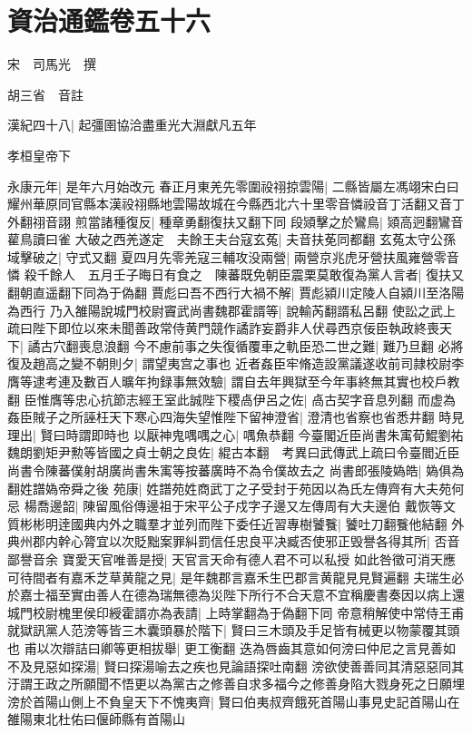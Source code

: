 \chapter{資治通鑑卷五十六}
宋　司馬光　撰

胡三省　音註

漢紀四十八|{
	起彊圉協洽盡重光大淵獻凡五年}


孝桓皇帝下

永康元年|{
	是年六月始改元}
春正月東羌先零圍祋祤掠雲陽|{
	二縣皆屬左馮翊宋白曰耀州華原同官縣本漢祋祤縣地雲陽故城在今縣西北六十里零音憐祋音丁活翻又音丁外翻祤音詡}
煎當諸種復反|{
	種章勇翻復扶又翻下同}
段熲擊之於鸞鳥|{
	熲高迥翻鸞音雚鳥讀曰雀}
大破之西羌遂定　夫餘王夫台寇玄菟|{
	夫音扶莬同都翻}
玄菟太守公孫域擊破之|{
	守式又翻}
夏四月先零羌寇三輔攻没兩營|{
	兩營京兆虎牙營扶風雍營零音憐}
殺千餘人　五月壬子晦日有食之　陳蕃既免朝臣震栗莫敢復為黨人言者|{
	復扶又翻朝直遥翻下同為于偽翻}
賈彪曰吾不西行大禍不解|{
	賈彪潁川定陵人自潁川至洛陽為西行}
乃入雒陽說城門校尉竇武尚書魏郡霍諝等|{
	說輸芮翻諝私呂翻}
使訟之武上疏曰陛下即位以來未聞善政常侍黄門競作譎詐妄爵非人伏尋西京佞臣執政終喪天下|{
	譎古穴翻喪息浪翻}
今不慮前事之失復循覆車之軌臣恐二世之難|{
	難乃旦翻}
必將復及趙高之變不朝則夕|{
	謂望夷宫之事也}
近者姦臣牢脩造設黨議遂收前司隷校尉李膺等逮考連及數百人曠年拘録事無效驗|{
	謂自去年興獄至今年事終無其實也校戶教翻}
臣惟膺等忠心抗節志經王室此誠陛下稷卨伊呂之佐|{
	卨古契字音息列翻}
而虚為姦臣賊子之所誣枉天下寒心四海失望惟陛下留神澄省|{
	澄清也省察也省悉井翻}
時見理出|{
	賢曰時謂即時也}
以厭神鬼喁喁之心|{
	喁魚恭翻}
今臺閣近臣尚書朱㝢荀鯤劉祐魏朗劉矩尹勲等皆國之貞士朝之良佐|{
	緄古本翻　考異曰武傳武上疏曰令臺閻近臣尚書令陳蕃僕射胡廣尚書朱㝢等按蕃廣時不為令僕故去之}
尚書郎張陵媯皓|{
	媯俱為翻姓譜媯帝舜之後}
苑康|{
	姓譜苑姓商武丁之子受封于苑因以為氏左傳齊有大夫苑何忌}
楊喬邊韶|{
	陳留風俗傳邊祖于宋平公子戍字子邊又左傳周有大夫邊伯}
戴恢等文質彬彬明逹國典内外之職羣才並列而陛下委任近習專樹饕餮|{
	饕吐刀翻餮他結翻}
外典州郡内幹心膂宜以次貶黜案罪糾罰信任忠良平决臧否使邪正毁譽各得其所|{
	否音鄙譽音余}
寶愛天官唯善是授|{
	天官言天命有德人君不可以私授}
如此咎徵可消天應可待間者有嘉禾芝草黄龍之見|{
	是年魏郡言嘉禾生巴郡言黄龍見見賢遍翻}
夫瑞生必於嘉士福至實由善人在德為瑞無德為災陛下所行不合天意不宜稱慶書奏因以病上還城門校尉槐里侯印綬霍諝亦為表請|{
	上時掌翻為于偽翻下同}
帝意稍解使中常侍王甫就獄訊黨人范滂等皆三木囊頭暴於階下|{
	賢曰三木頭及手足皆有械更以物蒙覆其頭也}
甫以次辯詰曰卿等更相拔舉|{
	更工衡翻}
迭為唇齒其意如何滂曰仲尼之言見善如不及見惡如探湯|{
	賢曰探湯喻去之疾也見論語探吐南翻}
滂欲使善善同其清惡惡同其汙謂王政之所願聞不悟更以為黨古之修善自求多福今之修善身陷大戮身死之日願埋滂於首陽山側上不負皇天下不愧夷齊|{
	賢曰伯夷叔齊餓死首陽山事見史記首陽山在雒陽東北杜佑曰偃師縣有首陽山}
